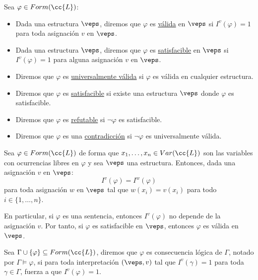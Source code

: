 
\begin{definicion}
    Sea $\varphi\in Form(\cc{L})$:
    \begin{itemize}
        \item Dada una estructura $\veps$, diremos que $\varphi$ es \underline{válida} en $\veps$ si $I^v(\varphi)=1$ para toda asignación $v$ en $\veps$.
        \item Dada una estructura $\veps$, diremos que $\varphi$ es \underline{satisfacible} en $\veps$ si $I^v(\varphi)=1$ para alguna asignación $v$ en $\veps$.
        \item Diremos que $\varphi$ es \underline{universalmente válida} si $\varphi$ es válida en cualquier estructura.
        \item Diremos que $\varphi$ es \underline{satisfacible} si existe una estructura $\veps$ donde $\varphi$ es satisfacible.
        \item Diremos que $\varphi$ es \underline{refutable} si $\lnot\varphi$ es satisfacible.
        \item Diremos que $\varphi$ es una \underline{contradicción} si $\lnot\varphi$ es universalmente válida.
    \end{itemize}
\end{definicion}

\begin{lema}[de Coincidencia]\label{lema:coincidencia}
    Sea $\varphi\in Form(\cc{L})$ de forma que $x_1,\ldots,x_n\in Var(\cc{L})$ son las variables con ocurrencias libres en $\varphi$ y sea $\veps$ una estructura. Entonces, dada una asignación $v$ en $\veps$:
    \begin{equation*}
        I^v(\varphi) = I^{w}(\varphi)
    \end{equation*}
    para toda asignación $w$ en $\veps$ tal que $w(x_i)=v(x_i)$ para todo $i \in \{1,\ldots,n\}$.
\end{lema}

\begin{observacion}
    En particular, si $\varphi$ es una sentencia, entonces $I^v(\varphi)$ no depende de la asignación $v$. Por tanto, si $\varphi$ es satisfacible en $\veps$, entonces $\varphi$ es válida en $\veps$.
\end{observacion}

\begin{definicion}
    Sea $\Gamma \cup \{\varphi\}\subseteq Form(\cc{L})$, diremos que $\varphi$ es consecuencia lógica de $\Gamma$, notado por $\Gamma\vDash \varphi$, si para toda interpretación $(\veps,v)$ tal que $I^v(\gamma)=1$ para toda $\gamma\in\Gamma$, fuerza a que $I^v(\varphi)=1$.
\end{definicion}

